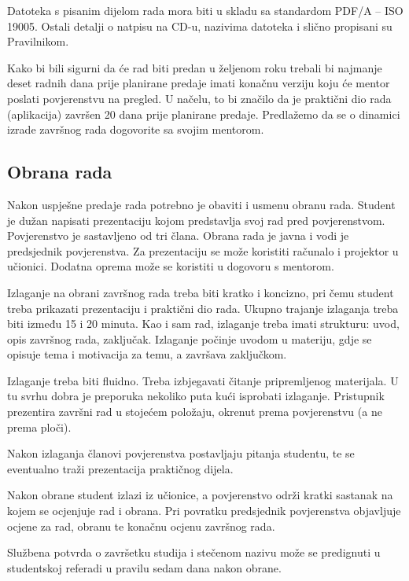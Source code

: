 Datoteka s pisanim dijelom rada mora biti u skladu sa standardom PDF/A – ISO 19005. Ostali detalji o natpisu na CD-u, nazivima datoteka i slično propisani su Pravilnikom.

Kako bi bili sigurni da će rad biti predan u željenom roku trebali bi najmanje deset radnih dana prije planirane predaje imati konačnu verziju koju će mentor poslati povjerenstvu na pregled. U načelu, to bi značilo da je praktični dio rada (aplikacija) završen 20 dana prije planirane predaje. Predlažemo da se o dinamici izrade završnog rada dogovorite sa svojim mentorom.

\subsection{Obrana rada}
Nakon uspješne predaje rada potrebno je obaviti i usmenu obranu rada. Student je dužan napisati prezentaciju kojom predstavlja svoj rad pred povjerenstvom. Povjerenstvo je sastavljeno od tri člana. Obrana rada je javna i vodi je predsjednik povjerenstva. Za prezentaciju se može koristiti računalo i projektor u učionici. Dodatna oprema može se koristiti u dogovoru s mentorom.

Izlaganje na obrani završnog rada treba biti kratko i koncizno, pri čemu student treba prikazati prezentaciju i praktični dio rada. Ukupno trajanje izlaganja treba biti između 15 i 20 minuta. Kao i sam rad, izlaganje treba imati strukturu: uvod, opis završnog rada, zaključak. Izlaganje počinje uvodom u materiju, gdje se opisuje tema i motivacija za temu, a završava zaključkom.

Izlaganje treba biti fluidno. Treba izbjegavati čitanje pripremljenog materijala. U tu svrhu dobra je preporuka nekoliko puta kući isprobati izlaganje. Pristupnik prezentira završni rad u stojećem položaju, okrenut prema povjerenstvu (a ne prema ploči).

Nakon izlaganja članovi povjerenstva postavljaju pitanja studentu, te se eventualno traži prezentacija praktičnog dijela. 

Nakon obrane student izlazi iz učionice, a povjerenstvo održi kratki sastanak na kojem se ocjenjuje rad i obrana. Pri povratku predsjednik povjerenstva objavljuje ocjene za rad, obranu te konačnu ocjenu završnog rada. 

Službena potvrda o završetku studija i stečenom nazivu može se predignuti u studentskoj referadi u pravilu sedam dana nakon obrane.
